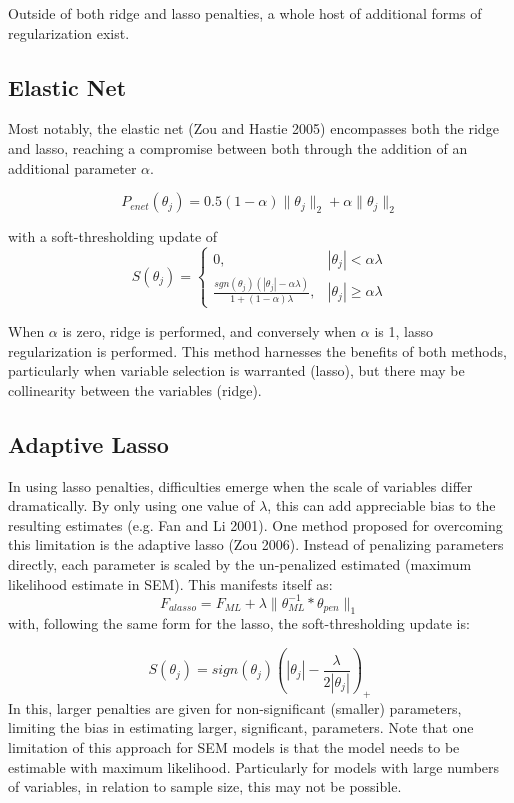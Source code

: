 \documentclass[article]{jss}
\begin{document}
Outside of both ridge and lasso penalties, a whole host of additional
forms of regularization exist.

\subsection{Elastic Net}\label{elastic-net}

Most notably, the elastic net (Zou and Hastie 2005) encompasses both the
ridge and lasso, reaching a compromise between both through the addition
of an additional parameter \(\alpha\).

\[
P_{enet}(\theta_{j}) = 0.5(1-\alpha)\| \theta_{j} \|_{2} + \alpha\| \theta_{j} \|_{2}
\]

with a soft-thresholding update of \[
S(\theta_{j})= 
\begin{cases}
0,&  |\theta_{j}| < \alpha\lambda\\
\frac{sgn(\theta_{j})(|\theta_{j}|-\alpha\lambda)}{1+(1-\alpha)\lambda},              & |\theta_{j}|\geq\alpha\lambda
\end{cases}
\]

\noindent
When \(\alpha\) is zero, ridge is performed, and conversely when
\(\alpha\) is 1, lasso regularization is performed. This method
harnesses the benefits of both methods, particularly when variable
selection is warranted (lasso), but there may be collinearity between
the variables (ridge).

\subsection{Adaptive Lasso}\label{adaptive-lasso}

In using lasso penalties, difficulties emerge when the scale of
variables differ dramatically. By only using one value of \(\lambda\),
this can add appreciable bias to the resulting estimates (e.g. Fan and
Li 2001). One method proposed for overcoming this limitation is the
adaptive lasso (Zou 2006). Instead of penalizing parameters directly,
each parameter is scaled by the un-penalized estimated (maximum
likelihood estimate in SEM). This manifests itself as: \[
F_{alasso} = F_{ML} + \lambda \| \theta_{ML}^{-1} * \theta_{pen} \|_{1}
\] \noindent
with, following the same form for the lasso, the soft-thresholding
update is:

\[
S(\theta_{j})= sign(\theta_{j})(|\theta_{j}|-\frac{\lambda}{2|\theta_{j}|})_{+}
\] \noindent
In this, larger penalties are given for non-significant (smaller)
parameters, limiting the bias in estimating larger, significant,
parameters. Note that one limitation of this approach for SEM models is
that the model needs to be estimable with maximum likelihood.
Particularly for models with large numbers of variables, in relation to
sample size, this may not be possible.
\end{document}

